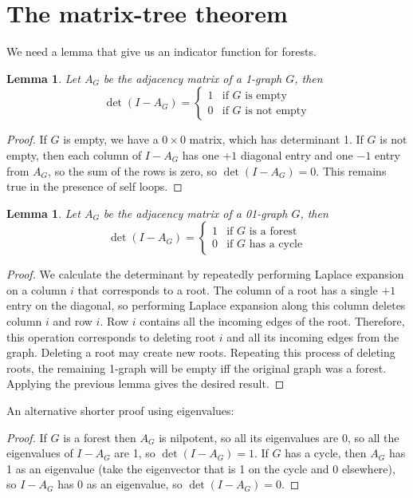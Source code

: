 \documentclass[a4paper, 11pt]{article}
\newtheorem{lemma}[theorem]{Lemma}
\theoremstyle{definition}
\begin{document}
\section{The matrix-tree theorem}

We need a lemma that give us an indicator function for forests.

\begin{lemma}
  Let $A_G$ be the adjacency matrix of a 1-graph $G$, then
  \[
    \det(I - A_G) = \begin{cases}
      1 & \text{if $G$ is empty} \\
      0 & \text{if $G$ is not empty}
    \end{cases}
  \]
\end{lemma}
\begin{proof}
  If $G$ is empty, we have a $0\times 0$ matrix, which has determinant 1.
  If $G$ is not empty, then each column of $I - A_G$ has one $+1$ diagonal entry and one $-1$ entry from $A_G$, so the sum of the rows is zero, so $\det(I - A_G) = 0$. This remains true in the presence of self loops.
\end{proof}

\begin{lemma}
  Let $A_G$ be the adjacency matrix of a 01-graph $G$, then
  \[
    \det(I-A_G) = \begin{cases}
      1 & \text{if $G$ is a forest}\\
      0 & \text{if $G$ has a cycle}
    \end{cases}
  \]
\end{lemma}
\begin{proof}
We calculate the determinant by repeatedly performing Laplace expansion on a column $i$ that corresponds to a root. The column of a root has a single $+1$ entry on the diagonal, so performing Laplace expansion along this column deletes column $i$ and row $i$. Row $i$ contains all the incoming edges of the root. Therefore, this operation corresponds to deleting root $i$ and all its incoming edges from the graph. Deleting a root may create new roots. Repeating this process of deleting roots, the remaining 1-graph will be empty iff the original graph was a forest. Applying the previous lemma gives the desired result.
\end{proof}

An alternative shorter proof using eigenvalues:

\begin{proof}
  If $G$ is a forest then $A_G$ is nilpotent, so all its eigenvalues are $0$, so all the eigenvalues of $I - A_G$ are 1, so $\det(I - A_G) = 1$.
  If $G$ has a cycle, then $A_G$ has 1 as an eigenvalue (take the eigenvector that is 1 on the cycle and 0 elsewhere), so $I - A_G$ has 0 as an eigenvalue, so $\det(I - A_G) = 0$.
\end{proof}
\end{document}
